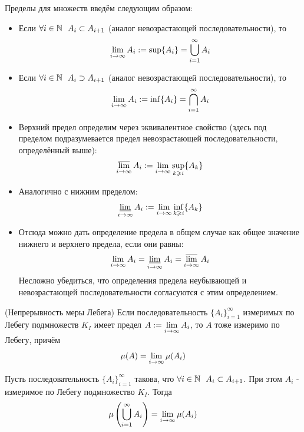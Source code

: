 \begin{definition}
	Пределы для множеств введём следующим образом:
	\begin{itemize}
		\item Если $\forall i \in \mathbb{N}\ \ A_i \subset A_{i + 1}$ (аналог невозрастающей последовательности), то
		\[
			\lim\limits_{i \to \infty} A_i := \sup \{A_i\} = \bigcup_{i = 1}^\infty A_i
		\]
		
		\item Если $\forall i \in \mathbb{N}\ \ A_i \supset A_{i + 1}$ (аналог невозрастающей последовательности), то
		\[
			\lim\limits_{i \to \infty} A_i := \inf \{A_i\} = \bigcap_{i = 1}^\infty A_i
		\]
		
		\item Верхний предел определим через эквивалентное свойство (здесь под пределом подразумевается предел невозрастающей последовательности, определённый выше):
		\[
			\varlimsup_{i \to \infty} A_i := \lim\limits_{i \to \infty} \sup_{k \geqslant i} \{A_k\}
		\]
		
		\item Аналогично с нижним пределом:
		\[
			\varliminf_{i \to \infty} A_i := \lim\limits_{i \to \infty} \inf_{k \geqslant i} \{A_k\}
		\]
		
		\item Отсюда можно дать определение предела в общем случае как общее значение нижнего и верхнего предела, если они равны:
		\[
			\lim\limits_{i \to \infty} A_i = \varliminf_{i \to \infty} A_i = \varlimsup_{i \to \infty} A_i
		\]
		Несложно убедиться, что определения предела неубывающей и невозрастающей последовательности согласуются с этим определением.
	\end{itemize}
\end{definition}

\begin{theorem} (Непрерывность меры Лебега) \label{4lemth}
	Если последовательность $\{A_i\}_{i = 1}^\infty$ измеримых по Лебегу подмножеств $K_I$ имеет предел $A := \lim\limits_{i \to \infty} A_i$, то $A$ тоже измеримо по Лебегу, причём
	\[
		\mu(A) = \lim\limits_{i \to \infty} \mu(A_i)
	\]
\end{theorem}

\begin{lemma}
	Пусть последовательность $\{A_i\}_{i = 1}^\infty$ такова, что $\forall i \in \mathbb{N}\ \ A_i \subset A_{i + 1}$. При этом $A_i$ - измеримое по Лебегу подмножество $K_I$. Тогда
	\[
		\mu\left(\bigcup_{i = 1}^\infty A_i\right) = \lim\limits_{i \to \infty} \mu(A_i)
	\]
\end{lemma}


